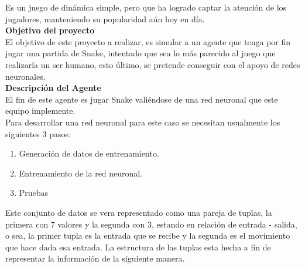 \documentclass[12pt]{article}
\begin{document}
        Es un juego de dinámica simple, pero que ha logrado captar la atención de los jugadores, manteniendo su popularidad aún hoy en día.\\
        
        {\bf Objetivo del proyecto}\\
        
        El objetivo de este proyecto a realizar, es simular a un agente que tenga por fin jugar una partida de Snake, intentado que sea lo más parecido al juego que realizaría un ser humano, esto último, se pretende conseguir con el apoyo de redes neuronales.\\
        
        {\bf Descripción del Agente}\\

        El fin de este agente es jugar Snake valiéndose de una red neuronal que este equipo implemente. \\
        
        Para desarrollar una red neuronal para este caso se necesitan usualmente los siguientes 3 pasos: 
        
        \begin{enumerate}
            \item Generación de datos de entrenamiento.
            \item Entrenamiento de la red neuronal.
            \item Pruebas
        \end{enumerate}
        
        Este conjunto de datos se vera representado como una pareja de tuplas, la primera con 7 valores y la segunda con 3, estando en relación de entrada - salida, o sea, la primer tupla es la entrada que se recibe y la segunda es el movimiento que hace dada esa entrada. La estructura de las tuplas esta hecha a fin de representar la información de la siguiente manera.\\
        
\end{document}
